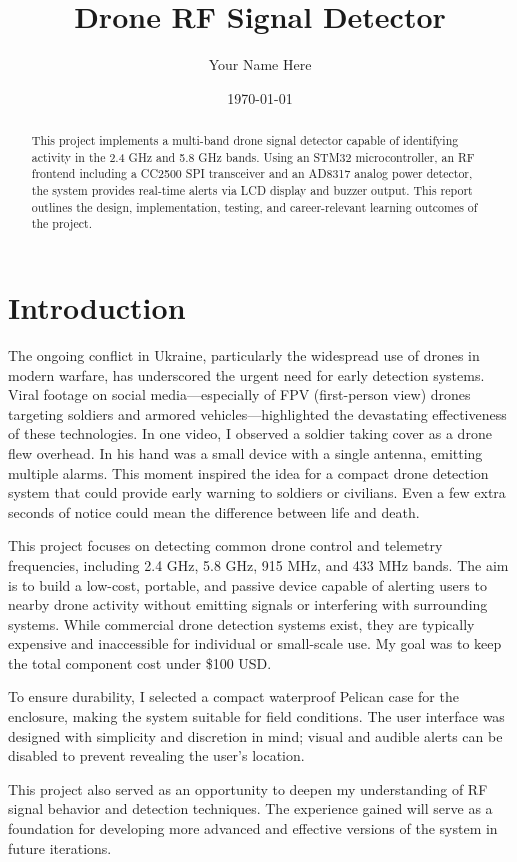 \documentclass[12pt]{article}
\title{Drone RF Signal Detector}
\author{Your Name Here}
\date{\today}
\begin{document}
\maketitle

\begin{abstract}
This project implements a multi-band drone signal detector capable of identifying activity in the 2.4 GHz and 5.8 GHz bands. Using an STM32 microcontroller, an RF frontend including a CC2500 SPI transceiver and an AD8317 analog power detector, the system provides real-time alerts via LCD display and buzzer output. This report outlines the design, implementation, testing, and career-relevant learning outcomes of the project.
\end{abstract}

\section{Introduction}
The ongoing conflict in Ukraine, particularly the widespread use of drones in modern warfare, has underscored the urgent need for early detection systems. Viral footage on social media—especially of FPV (first-person view) drones targeting soldiers and armored vehicles—highlighted the devastating effectiveness of these technologies. In one video, I observed a soldier taking cover as a drone flew overhead. In his hand was a small device with a single antenna, emitting multiple alarms. This moment inspired the idea for a compact drone detection system that could provide early warning to soldiers or civilians. Even a few extra seconds of notice could mean the difference between life and death.

This project focuses on detecting common drone control and telemetry frequencies, including 2.4 GHz, 5.8 GHz, 915 MHz, and 433 MHz bands. The aim is to build a low-cost, portable, and passive device capable of alerting users to nearby drone activity without emitting signals or interfering with surrounding systems. While commercial drone detection systems exist, they are typically expensive and inaccessible for individual or small-scale use. My goal was to keep the total component cost under \$100 USD.

To ensure durability, I selected a compact waterproof Pelican case for the enclosure, making the system suitable for field conditions. The user interface was designed with simplicity and discretion in mind; visual and audible alerts can be disabled to prevent revealing the user’s location.

This project also served as an opportunity to deepen my understanding of RF signal behavior and detection techniques. The experience gained will serve as a foundation for developing more advanced and effective versions of the system in future iterations.
\end{document}
